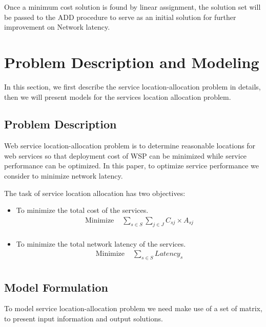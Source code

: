 \documentclass{llncs}
\begin{document}
Once a minimum cost solution is found by linear assignment, the solution set will be passed to the ADD procedure to serve as an initial solution for 
further improvement on Network latency.


\section{Problem Description and Modeling}
\label{sec:problem}
In this section, we first describe the service location-allocation problem in details, then we will present models for the services location allocation problem.

\subsection{Problem Description}
Web service location-allocation problem is to determine reasonable locations for web services so that deployment cost of WSP can be minimized while service performance can be optimized.
In this paper, to optimize service performance we consider to minimize network latency.

The task of service location allocation has two objectives:
\begin{itemize}
	\item To minimize the total cost of the services.
		\begin{equation}
     		\begin{align}
       			\mbox{Minimize } & \sum\limits_{s \in S} \sum\limits_{j \in J} C_{sj} \times A_{sj} \\
			\end{align}
		\end{equation}
	\item To minimize the total network latency of the services.
		\begin{equation}
     		\begin{align}
				\mbox{Minimize } & \sum\limits_{s \in S} Latency_{s} \\
			\end{align}
		\end{equation}
\end{itemize}


\subsection{Model Formulation}
To model service location-allocation problem we need make use of a set of matrix, to present input information and output solutions. 
\end{document}
